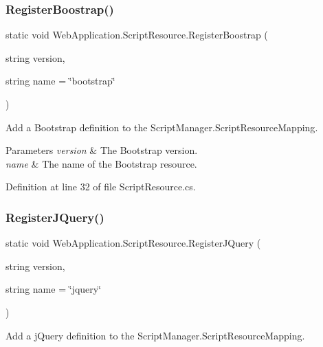 \subsubsection{\texorpdfstring{RegisterBoostrap()}{RegisterBoostrap()}}
{\footnotesize\ttfamily static void Web\+Application.\+Script\+Resource.\+Register\+Boostrap (\begin{DoxyParamCaption}\item[{string}]{version,  }\item[{string}]{name = {\ttfamily \char`\"{}bootstrap\char`\"{}} }\end{DoxyParamCaption})\hspace{0.3cm}{\ttfamily [static]}}



Add a Bootstrap definition to the {\ttfamily Script\+Manager.\+Script\+Resource\+Mapping}. 


\begin{DoxyParams}{Parameters}
{\em version} & The Bootstrap version.\\
\hline
{\em name} & The name of the Bootstrap resource.\\
\hline
\end{DoxyParams}


Definition at line 32 of file Script\+Resource.\+cs.

\mbox{\label{classWebApplication_1_1ScriptResource_a1e4b776e84558b4515f46ed08949e665}} 
\subsubsection{\texorpdfstring{RegisterJQuery()}{RegisterJQuery()}}
{\footnotesize\ttfamily static void Web\+Application.\+Script\+Resource.\+Register\+J\+Query (\begin{DoxyParamCaption}\item[{string}]{version,  }\item[{string}]{name = {\ttfamily \char`\"{}jquery\char`\"{}} }\end{DoxyParamCaption})\hspace{0.3cm}{\ttfamily [static]}}



Add a j\+Query definition to the {\ttfamily Script\+Manager.\+Script\+Resource\+Mapping}. 


